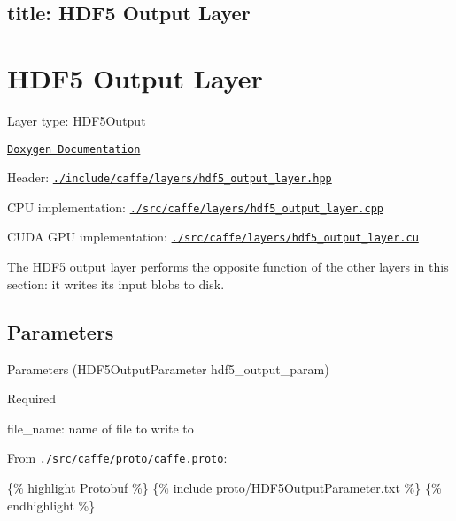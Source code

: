 

 \subsection*{title\+: H\+D\+F5 Output Layer }

\section*{H\+D\+F5 Output Layer}


\begin{DoxyItemize}
\item Layer type\+: {\ttfamily H\+D\+F5\+Output}
\item \href{http://caffe.berkeleyvision.org/doxygen/classcaffe_1_1HDF5OutputLayer.html}{\tt Doxygen Documentation}
\item Header\+: \href{https://github.com/BVLC/caffe/blob/master/include/caffe/layers/hdf5_output_layer.hpp}{\tt {\ttfamily ./include/caffe/layers/hdf5\+\_\+output\+\_\+layer.hpp}}
\item C\+PU implementation\+: \href{https://github.com/BVLC/caffe/blob/master/src/caffe/layers/hdf5_output_layer.cpp}{\tt {\ttfamily ./src/caffe/layers/hdf5\+\_\+output\+\_\+layer.cpp}}
\item C\+U\+DA G\+PU implementation\+: \href{https://github.com/BVLC/caffe/blob/master/src/caffe/layers/hdf5_output_layer.cu}{\tt {\ttfamily ./src/caffe/layers/hdf5\+\_\+output\+\_\+layer.cu}}
\end{DoxyItemize}

The H\+D\+F5 output layer performs the opposite function of the other layers in this section\+: it writes its input blobs to disk.

\subsection*{Parameters}


\begin{DoxyItemize}
\item Parameters ({\ttfamily H\+D\+F5\+Output\+Parameter hdf5\+\_\+output\+\_\+param})
\begin{DoxyItemize}
\item Required
\begin{DoxyItemize}
\item {\ttfamily file\+\_\+name}\+: name of file to write to
\end{DoxyItemize}
\end{DoxyItemize}
\item From \href{https://github.com/BVLC/caffe/blob/master/src/caffe/proto/caffe.proto}{\tt {\ttfamily ./src/caffe/proto/caffe.proto}}\+:
\end{DoxyItemize}

\{\% highlight Protobuf \%\} \{\% include proto/\+H\+D\+F5\+Output\+Parameter.\+txt \%\} \{\% endhighlight \%\} 